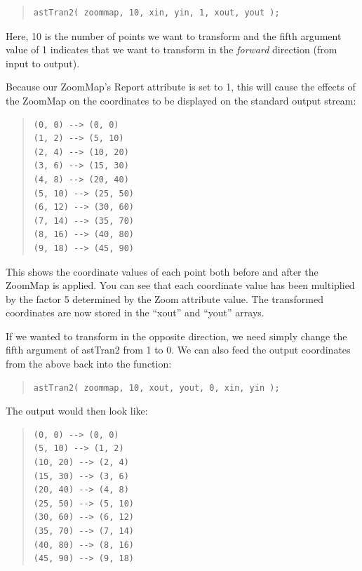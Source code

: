 \documentclass[twoside,11pt]{article}
\newcommand{\htmlref}[2]{#1}
\begin{document}
\begin{quote}
\small
\begin{verbatim}
astTran2( zoommap, 10, xin, yin, 1, xout, yout );
\end{verbatim}
\normalsize
\end{quote}

Here, 10 is the number of points we want to transform and the fifth
argument value of 1 indicates that we want to transform in the
{\em{forward}} direction (from input to output).

Because our ZoomMap's Report attribute is set to 1, this will cause
the effects of the ZoomMap on the coordinates to be displayed on the
standard output stream:

\begin{quote}
\small
\begin{verbatim}
(0, 0) --> (0, 0)
(1, 2) --> (5, 10)
(2, 4) --> (10, 20)
(3, 6) --> (15, 30)
(4, 8) --> (20, 40)
(5, 10) --> (25, 50)
(6, 12) --> (30, 60)
(7, 14) --> (35, 70)
(8, 16) --> (40, 80)
(9, 18) --> (45, 90)
\end{verbatim}
\normalsize
\end{quote}

This shows the coordinate values of each point both before and after
the ZoomMap is applied. You can see that each coordinate value has
been multiplied by the factor 5 determined by the \htmlref{Zoom}{Zoom} attribute
value. The transformed coordinates are now stored in the ``xout'' and
``yout'' arrays.

If we wanted to transform in the opposite direction, we need simply
change the fifth argument of astTran2 from 1 to 0. We can also feed
the output coordinates from the above back into the function:

\begin{quote}
\small
\begin{verbatim}
astTran2( zoommap, 10, xout, yout, 0, xin, yin );
\end{verbatim}
\normalsize
\end{quote}

The output would then look like:

\begin{quote}
\small
\begin{verbatim}
(0, 0) --> (0, 0)
(5, 10) --> (1, 2)
(10, 20) --> (2, 4)
(15, 30) --> (3, 6)
(20, 40) --> (4, 8)
(25, 50) --> (5, 10)
(30, 60) --> (6, 12)
(35, 70) --> (7, 14)
(40, 80) --> (8, 16)
(45, 90) --> (9, 18)
\end{verbatim}
\normalsize
\end{quote}
\end{document}
